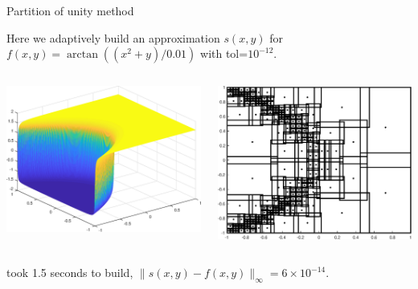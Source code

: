 \documentclass{beamer}
\newcommand{\lp}{\left(}
\newcommand{\rp}{\right)}
\begin{document}
\begin{frame}{Partition of unity method}

Here we adaptively build an approximation $s(x,y)$ for $f(x,y) = \arctan \lp \lp x^2+y \rp/0.01 \rp$ with tol=$10^{-12}$.
\bigskip

\begin{columns}[t]

\begin{column}{0.5\textwidth}	
\begin{center}
\includegraphics[scale = 0.3]{tan2Dplot.eps}	
\end{center}
\end{column}

\begin{column}{0.5\textwidth}
\begin{center}
\includegraphics[scale = 0.3]{tan2Dsubdomains.eps}	
\end{center}
\end{column}

\end{columns}

\begin{center}
took 1.5 seconds to build, $\| s(x,y)-f(x,y)\|_{\infty} = 6\times10^{-14}$.	
\end{center}

\end{frame}
\end{document}
